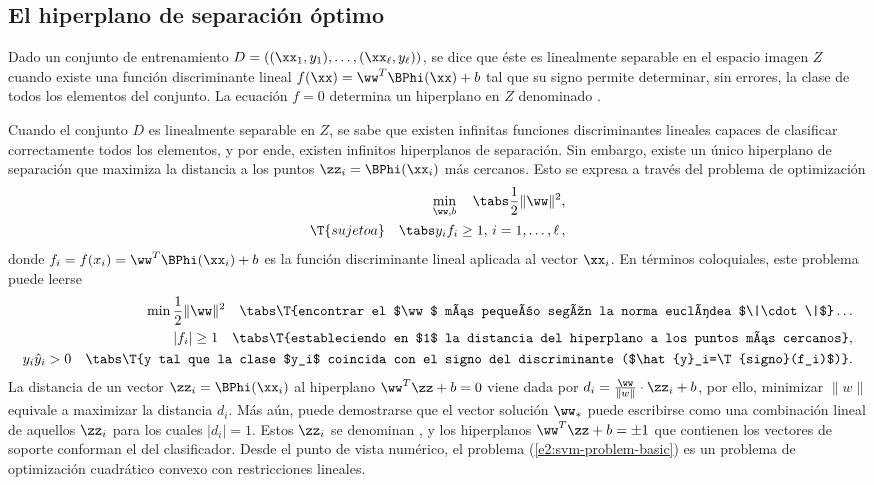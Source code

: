 %
%
\subsection{El hiperplano de separación óptimo}
%
Dado un conjunto de entrenamiento
$D=\left((\xx_1,y_1),\ldots,(\xx_\ell,y_\ell)\right)$, se dice que
éste es linealmente separable en el espacio imagen $Z$ cuando existe
una función discriminante lineal $f(\xx)=\ww^T\BPhi(\xx)+b$ tal
que su signo permite determinar, sin errores, la clase de todos los
elementos del conjunto. La ecuación $f=0$ determina un
hiperplano en $Z$ denominado .

Cuando el conjunto $D$ es linealmente separable en $Z$, se sabe que
existen infinitas funciones discriminantes lineales capaces de
clasificar correctamente todos los elementos, y por ende, existen
infinitos hiperplanos de separación.  Sin embargo, existe un único
hiperplano de separación  que maximiza la distancia a los
puntos $\zz_i=\BPhi(\xx_i)$ más cercanos.  Esto se expresa a través del
problema de optimización
%
\begin{align}\label{e2:svm-problem-basic}
  \begin{split}
    \min_{\ww,b} \quad\tabs \frac{1}{2}\|\ww\|^2, \\
    \T{sujeto a}\quad\tabs y_i f_i\geq1,\,i=1,\ldots,\ell\,, 
  \end{split}
\end{align}
%
donde $f_i=f(x_i)=\ww^T\BPhi(\xx_i)+b$ es la función discriminante
lineal aplicada al vector $\xx_i$. En términos coloquiales, este
problema puede leerse
%
\begin{align*}
  \begin{split}
    \min \frac{1}{2}\|\ww\|^2 \quad \tabs \T{encontrar el $\ww$ más
      pequeño según la norma euclídea $\|\cdot\|$}\ldots\\
    |f_i|\geq1 \quad \tabs \T{estableciendo en $1$ la distancia del
      hiperplano a los puntos más cercanos},\\
    y_i\hat{y}_i>0\quad \tabs \T{y tal que la clase $y_i$ coincida con el
      signo del discriminante ($\hat{y}_i=\T{signo}(f_i)$)}.
  \end{split}
\end{align*}
%
La distancia de un vector $\zz_i=\BPhi(\xx_i)$ al hiperplano
$\ww^T\zz+b=0$ viene dada por $d_i=\frac{\ww}{\|w\|}\cdot\zz_i+b$, por
ello, minimizar $\|w\|$ equivale a maximizar la distancia $d_i$.  Más
aún, puede demostrarse que el vector solución $\ww_*$ puede escribirse
como una combinación lineal de aquellos $\zz_i$ para los cuales
$|d_i|=1$.  Estos $\zz_i$ se denominan , y los
hiperplanos $\ww^T\zz+b=\pm1$ que contienen los vectores de soporte
conforman el  del clasificador.
Desde el punto de vista numérico, el problema
(\ref{e2:svm-problem-basic}) es un problema de optimización cuadrático
convexo con restricciones lineales.
